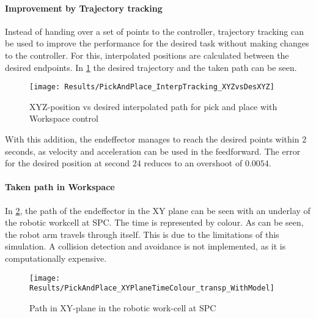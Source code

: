 \paragraph{Improvement by Trajectory tracking}
Instead of handing over a set of points to the controller, trajectory tracking can be used to improve the performance for the desired task without making changes to the controller.
For this, interpolated positions are calculated between the desired endpoints.
In \cref{fig:PickAndPlace_InterpTracking_XYZvsDesXYZ} the desired trajectory and the taken path can be seen.
\begin{figure}[H]
	\texttt{[image: Results/PickAndPlace\_InterpTracking\_XYZvsDesXYZ]}
	\caption{XYZ-position vs desired interpolated path for pick and place with Workspace control}
	\label{fig:PickAndPlace_InterpTracking_XYZvsDesXYZ}
\end{figure}
With this addition, the endeffector manages to reach the desired points within 2 seconds, as velocity and acceleration can be used in the feedforward. The error for the desired position at second $24$ reduces to an overshoot of $0.0054$.

\paragraph{Taken path in Workspace}
In \cref{fig:PickAndPlace_XYPlane_WithModel}, the path of the endeffector in the XY plane can be seen with an underlay of the robotic workcell at SPC. The time is represented by colour.
As can be seen, the robot arm travels through itself. This is due to the limitations of this simulation. A collision detection and avoidance is not implemented, as it is computationally expensive. 

\begin{figure}[H]
	\texttt{[image: Results/PickAndPlace\_XYPlaneTimeColour\_transp\_WithModel]}
	\caption{Path in XY-plane in the robotic work-cell at SPC}
	\label{fig:PickAndPlace_XYPlane_WithModel}
\end{figure}